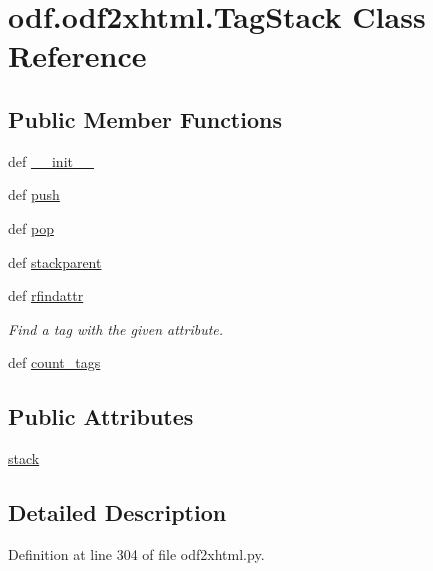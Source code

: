 \hypertarget{classodf_1_1odf2xhtml_1_1TagStack}{\section{odf.\+odf2xhtml.\+Tag\+Stack Class Reference}
\label{classodf_1_1odf2xhtml_1_1TagStack}
}
\subsection*{Public Member Functions}
\begin{DoxyCompactItemize}
\item 
def \hyperlink{classodf_1_1odf2xhtml_1_1TagStack_a91e555f66d1de8c871787d49ffe4956a}{\+\_\+\+\_\+init\+\_\+\+\_\+}
\item 
def \hyperlink{classodf_1_1odf2xhtml_1_1TagStack_a515eccf8cd55b1d293dd8ebb3d61cbeb}{push}
\item 
def \hyperlink{classodf_1_1odf2xhtml_1_1TagStack_a12761df2041ffb3004ab1d7b97193db5}{pop}
\item 
def \hyperlink{classodf_1_1odf2xhtml_1_1TagStack_a287c7a627bb09539c8ef89118d74c614}{stackparent}
\item 
def \hyperlink{classodf_1_1odf2xhtml_1_1TagStack_a3ea03cd9a6ce9dc7a1624ae7ada9e4cf}{rfindattr}
\begin{DoxyCompactList}\small\item\em Find a tag with the given attribute. \end{DoxyCompactList}\item 
def \hyperlink{classodf_1_1odf2xhtml_1_1TagStack_aaae1a628e6193972fde0bce41d237cfb}{count\+\_\+tags}
\end{DoxyCompactItemize}
\subsection*{Public Attributes}
\begin{DoxyCompactItemize}
\item 
\hyperlink{classodf_1_1odf2xhtml_1_1TagStack_a445684cfc8bfc9e2a6dd6800119d33fc}{stack}
\end{DoxyCompactItemize}


\subsection{Detailed Description}


Definition at line 304 of file odf2xhtml.\+py.




